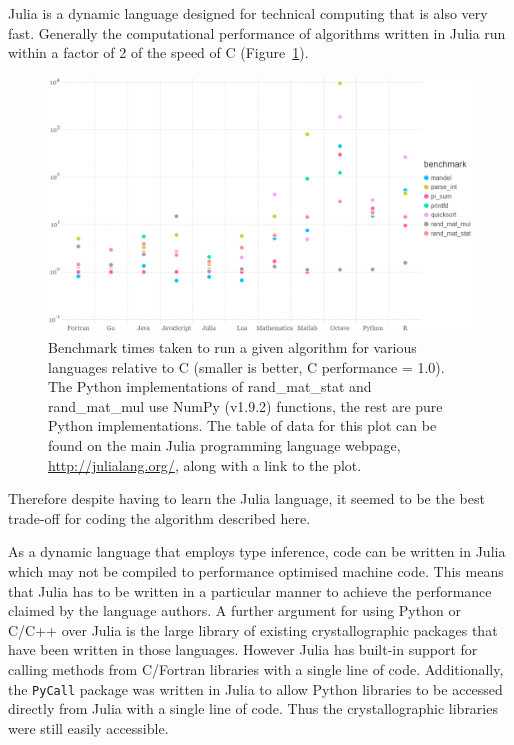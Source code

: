 Julia is a dynamic language designed for technical computing \cite{bezanson2014julia,bezanson2012julia} that is also very fast.
Generally the computational performance of algorithms written in Julia run within a factor of 2 of the speed of C (Figure~\ref{fig:Language performance benchmarks}).
\begin{figure}[ht!]
    \centering
    \includegraphics[width=1.0\textwidth]{figures/datared/language_benchmarks.png}
    \caption[Benchmark times taken to run a given algorithm for various languages relative to C.]{Benchmark times taken to run a given algorithm for various languages relative to C (smaller is better, C performance = 1.0).
    The Python implementations of rand\_mat\_stat and rand\_mat\_mul use NumPy (v1.9.2) functions, the rest are pure Python implementations.
    The table of data for this plot can be found on the main Julia programming language webpage, \url{http://julialang.org/}, along with a link to the plot.}
    \label{fig:Language performance benchmarks}
\end{figure}
Therefore despite having to learn the Julia language, it seemed to be the best trade-off for coding the algorithm described here.

As a dynamic language that employs type inference, code can be written in Julia which may not be compiled to performance optimised machine code.
This means that Julia has to be written in a particular manner to achieve the performance claimed by the language authors.
A further argument for using Python or C/C++ over Julia is the large library of existing crystallographic packages that have been written in those languages.
However Julia has built-in support for calling methods from C/Fortran libraries with a single line of code.
Additionally, the \verb+PyCall+ package was written in Julia to allow Python libraries to be accessed directly from Julia with a single line of code.
Thus the crystallographic libraries were still easily accessible.
